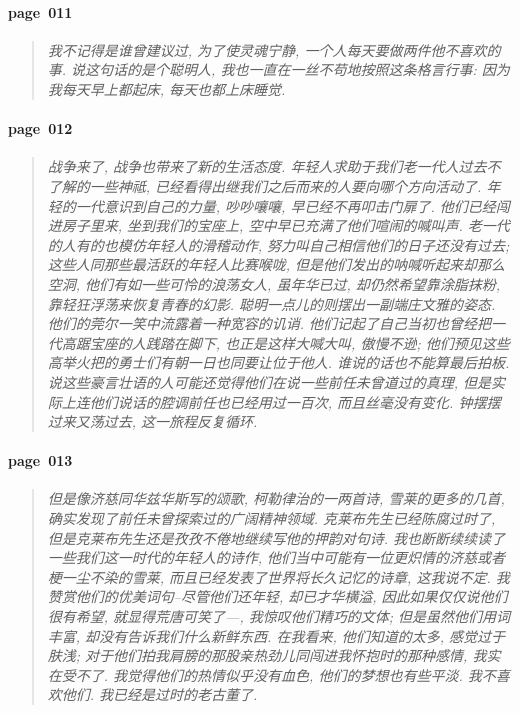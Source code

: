 \paragraph*{page~011}
\begin{quotation}
    \itshape
    我不记得是谁曾建议过, 为了使灵魂宁静, 一个人每天要做两件他不喜欢的事. 说这句话的是个聪明人, 我也一直在一丝不苟地按照这条格言行事: 因为我每天早上都起床, 每天也都上床睡觉.
\end{quotation}

\paragraph*{page~012}
\begin{quotation}
    \itshape
    战争来了, 战争也带来了新的生活态度. 年轻人求助于我们老一代人过去不了解的一些神祗, 已经看得出继我们之后而来的人要向哪个方向活动了. 年轻的一代意识到自己的力量, 吵吵嚷嚷, 早已经不再叩击门扉了. 他们已经闯进房子里来, 坐到我们的宝座上, 空中早已充满了他们喧闹的喊叫声. 老一代的人有的也模仿年轻人的滑稽动作, 努力叫自己相信他们的日子还没有过去; 这些人同那些最活跃的年轻人比赛喉咙, 但是他们发出的呐喊听起来却那么空洞, 他们有如一些可怜的浪荡女人, 虽年华已过, 却仍然希望靠涂脂抹粉, 靠轻狂浮荡来恢复青春的幻影. 聪明一点儿的则摆出一副端庄文雅的姿态. 他们的莞尔一笑中流露着一种宽容的讥诮. 他们记起了自己当初也曾经把一代高踞宝座的人践踏在脚下, 也正是这样大喊大叫, 傲慢不逊; 他们预见这些高举火把的勇士们有朝一日也同要让位于他人. 谁说的话也不能算最后拍板. 说这些豪言壮语的人可能还觉得他们在说一些前任未曾道过的真理, 但是实际上连他们说话的腔调前任也已经用过一百次, 而且丝毫没有变化. 钟摆摆过来又荡过去, 这一旅程反复循环. 
\end{quotation}

\paragraph*{page~013}
\begin{quotation}
    \itshape
    但是像济慈同华兹华斯写的颂歌, 柯勒律治的一两首诗, 雪莱的更多的几首, 确实发现了前任未曾探索过的广阔精神领域. 克莱布先生已经陈腐过时了, 但是克莱布先生还是孜孜不倦地继续写他的押韵对句诗. 我也断断续续读了一些我们这一时代的年轻人的诗作, 他们当中可能有一位更炽情的济慈或者梗一尘不染的雪莱, 而且已经发表了世界将长久记忆的诗章, 这我说不定. 我赞赏他们的优美词句--尽管他们还年轻, 却已才华横溢, 因此如果仅仅说他们很有希望, 就显得荒唐可笑了---, 我惊叹他们精巧的文体; 但是虽然他们用词丰富, 却没有告诉我们什么新鲜东西. 在我看来, 他们知道的太多, 感觉过于肤浅; 对于他们拍我肩膀的那股亲热劲儿同闯进我怀抱时的那种感情, 我实在受不了. 我觉得他们的热情似乎没有血色, 他们的梦想也有些平淡. 我不喜欢他们. 我已经是过时的老古董了.
\end{quotation}

